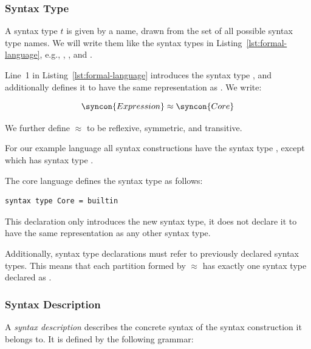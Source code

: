 \documentclass{kththesis}
\begin{document}
\subsubsection{Syntax Type}

A syntax type $t$ is given by a name, drawn from the set of all possible syntax type names. We will write them like the syntax types in Listing~\ref{lst:formal-language}, e.g., , , and .

Line~1 in Listing~\ref{lst:formal-language} introduces the syntax type , and additionally defines it to have the same representation as . We write:

$$
\syncon{Expression} \approx \syncon{Core}
$$

We further define $\approx$ to be reflexive, symmetric, and transitive.

For our example language all syntax constructions have the syntax type , except  which has syntax type .

The core language defines the syntax type  as follows:

\begin{verbatim}
syntax type Core = builtin
\end{verbatim}

This declaration only introduces the new syntax type, it does not declare it to have the same representation as any other syntax type.

Additionally, syntax type declarations must refer to previously declared syntax types. This means that each partition formed by $\approx$ has exactly one syntax type declared as .

\subsubsection{Syntax Description}

A \emph{syntax description} describes the concrete syntax of the syntax construction it belongs to. It is defined by the following grammar:

\newcommand{\ident}{\mathrel{\mathbf{identifier}}}
\newcommand{\integer}{\mathrel{\mathbf{integer}}}
\newcommand{\float}{\mathrel{\mathbf{float}}}
\newcommand{\seq}{\mathrel{\mathbf{seq}}}
\newcommand{\repstar}{\mathrel{\mathbf{star}}}
\newcommand{\repplus}{\mathrel{\mathbf{plus}}}
\newcommand{\repquestion}{\mathrel{\mathbf{question}}}
\end{document}
